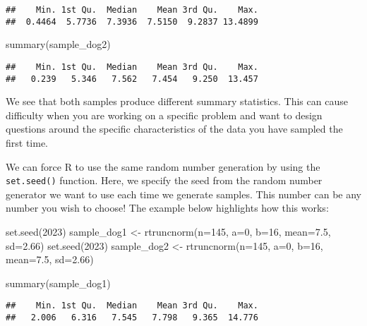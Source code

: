 \documentclass[
]{book}
\newenvironment{Shaded}{\begin{snugshade}}{\end{snugshade}}
\newcommand{\AttributeTok}[1]{\textcolor[rgb]{0.77,0.63,0.00}{#1}}
\newcommand{\DecValTok}[1]{\textcolor[rgb]{0.00,0.00,0.81}{#1}}
\newcommand{\FloatTok}[1]{\textcolor[rgb]{0.00,0.00,0.81}{#1}}
\newcommand{\FunctionTok}[1]{\textcolor[rgb]{0.00,0.00,0.00}{#1}}
\newcommand{\NormalTok}[1]{#1}
\newcommand{\OtherTok}[1]{\textcolor[rgb]{0.56,0.35,0.01}{#1}}
\begin{document}
\begin{verbatim}
##    Min. 1st Qu.  Median    Mean 3rd Qu.    Max. 
##  0.4464  5.7736  7.3936  7.5150  9.2837 13.4899
\end{verbatim}

\begin{Shaded}
\begin{Highlighting}[]
\FunctionTok{summary}\NormalTok{(sample\_dog2)}
\end{Highlighting}
\end{Shaded}

\begin{verbatim}
##    Min. 1st Qu.  Median    Mean 3rd Qu.    Max. 
##   0.239   5.346   7.562   7.454   9.250  13.457
\end{verbatim}

We see that both samples produce different summary statistics. This can cause difficulty when you are working on a specific problem and want to design questions around the specific characteristics of the data you have sampled the first time.

We can force R to use the same random number generation by using the \texttt{set.seed()} function. Here, we specify the seed from the random number generator we want to use each time we generate samples. This number can be any number you wish to choose! The example below highlights how this works:

\begin{Shaded}
\begin{Highlighting}[]
\FunctionTok{set.seed}\NormalTok{(}\DecValTok{2023}\NormalTok{)}
\NormalTok{sample\_dog1 }\OtherTok{\textless{}{-}} \FunctionTok{rtruncnorm}\NormalTok{(}\AttributeTok{n=}\DecValTok{145}\NormalTok{, }\AttributeTok{a=}\DecValTok{0}\NormalTok{, }\AttributeTok{b=}\DecValTok{16}\NormalTok{, }\AttributeTok{mean=}\FloatTok{7.5}\NormalTok{, }\AttributeTok{sd=}\FloatTok{2.66}\NormalTok{)}
\FunctionTok{set.seed}\NormalTok{(}\DecValTok{2023}\NormalTok{)}
\NormalTok{sample\_dog2 }\OtherTok{\textless{}{-}} \FunctionTok{rtruncnorm}\NormalTok{(}\AttributeTok{n=}\DecValTok{145}\NormalTok{, }\AttributeTok{a=}\DecValTok{0}\NormalTok{, }\AttributeTok{b=}\DecValTok{16}\NormalTok{, }\AttributeTok{mean=}\FloatTok{7.5}\NormalTok{, }\AttributeTok{sd=}\FloatTok{2.66}\NormalTok{)}

\FunctionTok{summary}\NormalTok{(sample\_dog1)}
\end{Highlighting}
\end{Shaded}

\begin{verbatim}
##    Min. 1st Qu.  Median    Mean 3rd Qu.    Max. 
##   2.006   6.316   7.545   7.798   9.365  14.776
\end{verbatim}
\end{document}

